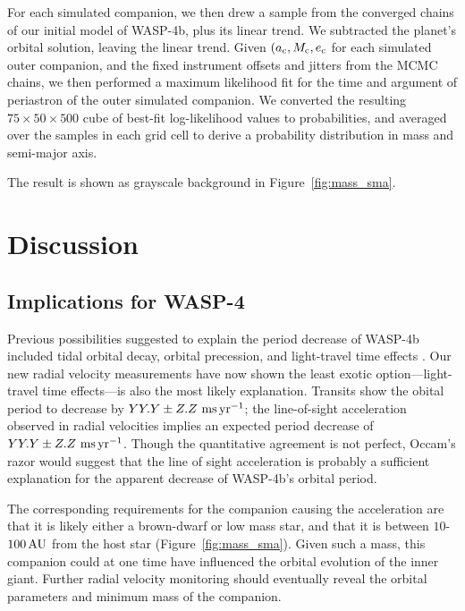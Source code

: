 \documentclass[12pt,twocolumn,tighten]{aastex62}
\begin{document}
For each simulated companion, we then drew a sample from the converged
chains of our initial model of WASP-4b, plus its linear trend. We
subtracted the planet's orbital solution, leaving the linear trend.
Given $(a_{\rm c}, M_{\rm c}, e_{\rm c}$ for each simulated outer
companion, and the fixed instrument offsets and jitters from the MCMC
chains, we then performed a maximum likelihood fit for the time and
argument of periastron of the outer simulated companion.  We converted
the resulting $75\times50\times500$ cube of best-fit log-likelihood
values to probabilities, and averaged over the samples in each grid
cell to derive a probability distribution in mass and semi-major axis.

The result is shown as grayscale background in
Figure~\ref{fig:mass_sma}.



\section{Discussion}
\label{sec:discussion}

\subsection{Implications for WASP-4}
Previous possibilities suggested to explain the period decrease of
WASP-4b included tidal orbital decay, orbital precession, and
light-travel time effects \citep{bouma_wasp4b_2019}.  Our new radial
velocity measurements have now shown the least exotic
option---light-travel time effects---is also the most likely
explanation.  Transits show the obital period to decrease by $YY.Y \pm
Z.Z~{\rm ms}\,{\rm yr}^{-1}$; the line-of-sight acceleration observed
in radial velocities implies an expected period decrease of $YY.Y \pm
Z.Z~{\rm ms}\,{\rm yr}^{-1}$.  
Though the quantitative agreement is not perfect, Occam's razor would
suggest that the line of sight acceleration is probably a sufficient
explanation for the apparent decrease of WASP-4b's orbital period.

The corresponding requirements for the companion causing the
acceleration are that it is likely either a brown-dwarf or low mass
star, and that it is between $10$-$100\,{\rm AU}$ from the host star
(Figure~\ref{fig:mass_sma}).
Given such a mass, this companion could at one time have influenced
the orbital evolution of the inner giant.
Further radial velocity monitoring should eventually reveal the
orbital parameters and minimum mass of the companion.
\end{document}
